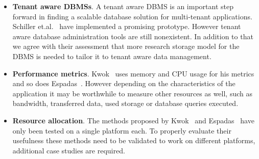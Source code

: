 \begin{itemize}
	\item \textbf{Tenant aware \acp{DBMS}}.
		A tenant aware \ac{DBMS} is an important step forward in finding a scalable database solution for multi-tenant applications.
		Schiller et.al.~\cite{schiller2011native} have implemented a promising prototype. However tenant aware database administration tools are still nonexistent.
		In addition to that we agree with their assessment that more research storage model for the \ac{DBMS} is needed to tailor it to tenant aware data management.
	\item \textbf{Performance metrics}.
		Kwok~\cite{kwok2008resource} uses memory and CPU usage for his metrics and so does Espadas~\cite{espadas2013tenant}. 
		However depending on the characteristics of the application it may be worthwhile to measure other resources as well, such as bandwidth, transferred data, used storage or database queries executed. 
	\item \textbf{Resource allocation}.
		The methods proposed by Kwok~\cite{kwok2008resource} and Espadas~\cite{espadas2013tenant} have only been tested on a single platform each.
		To properly evaluate their usefulness these methods need to be validated to work on different platforms, additional case studies are required.
\end{itemize}
